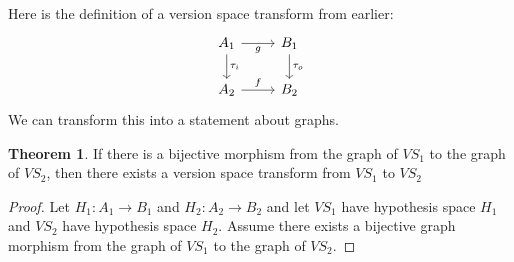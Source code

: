 \documentclass{article}
\theoremstyle{definition}
\newtheorem{theorem}{Theorem}[section]
\begin{document}
Here is the definition of a version space transform from earlier: 
\[\begin{tikzcd}
	{A_1} & {B_1} \\
	{A_2} & {B_2}
	\arrow["{\tau_i}", from=1-1, to=2-1]
	\arrow["g"', from=1-1, to=1-2]
	\arrow["{\tau_o}", to=2-2, from=1-2]
	\arrow["f", from=2-1, to=2-2]
\end{tikzcd}\]
We can transform this into a statement about graphs.
\begin{theorem}
 If there is a bijective morphism from the graph of $VS_1$ to the graph of $VS_2$, then there exists a version space transform from $VS_1$ to $VS_2$ 
\end{theorem}
\begin{proof}
Let $H_1 : A_1 \rightarrow B_1$ and $H_2 : A_2 \rightarrow B_2$ and let $VS_1$ have hypothesis space $H_1$ and $VS_2$ have hypothesis space $H_2$. Assume there exists a bijective graph morphism from the graph of $VS_1$ to the graph of $VS_2$. 


\end{proof}
\end{document}
